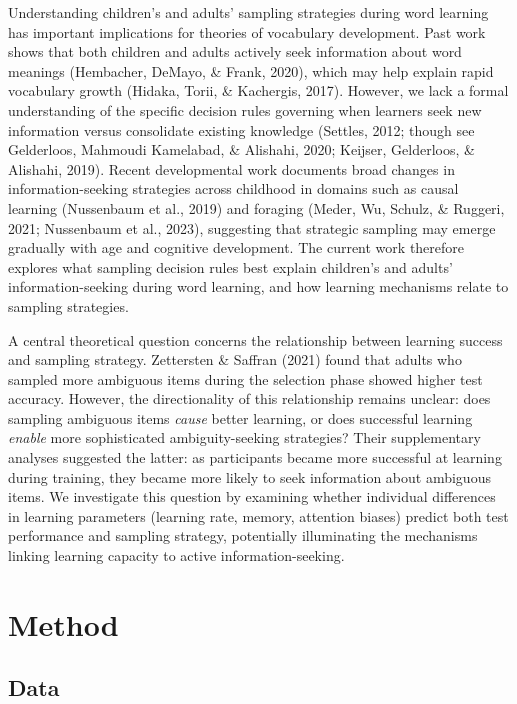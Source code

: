 \documentclass[10pt, letterpaper]{article}
\begin{document}
Understanding children's and adults' sampling strategies during word
learning has important implications for theories of vocabulary
development. Past work shows that both children and adults actively seek
information about word meanings (Hembacher, DeMayo, \& Frank, 2020),
which may help explain rapid vocabulary growth (Hidaka, Torii, \&
Kachergis, 2017). However, we lack a formal understanding of the
specific decision rules governing when learners seek new information
versus consolidate existing knowledge (Settles, 2012; though see
Gelderloos, Mahmoudi Kamelabad, \& Alishahi, 2020; Keijser, Gelderloos,
\& Alishahi, 2019). Recent developmental work documents broad changes in
information-seeking strategies across childhood in domains such as
causal learning (Nussenbaum et al., 2019) and foraging (Meder, Wu,
Schulz, \& Ruggeri, 2021; Nussenbaum et al., 2023), suggesting that
strategic sampling may emerge gradually with age and cognitive
development. The current work therefore explores what sampling decision
rules best explain children's and adults' information-seeking during
word learning, and how learning mechanisms relate to sampling
strategies.

A central theoretical question concerns the relationship between
learning success and sampling strategy. Zettersten \& Saffran (2021)
found that adults who sampled more ambiguous items during the selection
phase showed higher test accuracy. However, the directionality of this
relationship remains unclear: does sampling ambiguous items \emph{cause}
better learning, or does successful learning \emph{enable} more
sophisticated ambiguity-seeking strategies? Their supplementary analyses
suggested the latter: as participants became more successful at learning
during training, they became more likely to seek information about
ambiguous items. We investigate this question by examining whether
individual differences in learning parameters (learning rate, memory,
attention biases) predict both test performance and sampling strategy,
potentially illuminating the mechanisms linking learning capacity to
active information-seeking.

\section{Method}\label{method}

\subsection{Data}\label{data}
\end{document}
